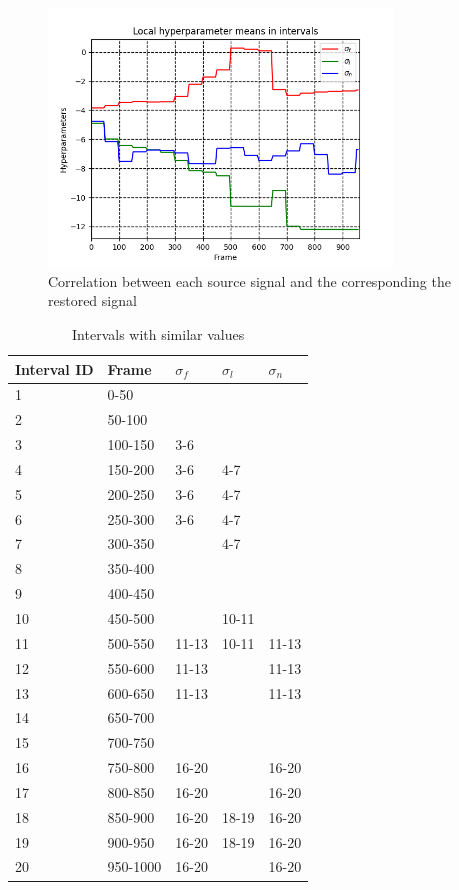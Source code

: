 \documentclass[conference]{IEEEtran}
\begin{document}
\begin{figure}[!t]
	\centering
	\includegraphics[width=3.6in]{interval.png}	
	\caption{Correlation between each source signal and the corresponding the restored signal}
	\label{fig:interval}
\end{figure}

\begin{table}
\caption{Intervals with similar values}
 	\label{table:interval}
\begin{tabular}{ |p{1.5cm}||p{1.2cm}|p{1cm}|p{1cm}|p{1cm}|  }
 \hline
 Interval ID & Frame & $\sigma_f$ & $\sigma_l$ & $\sigma_n$\\
 \hline
	1 & 0-50 	&		&		&		\\
	2 & 50-100 	&		&		&		\\
	3 & 100-150 & 3-6 	&		&		\\
	4 & 150-200 & 3-6 	& 4-7 	&		\\
	5 & 200-250 & 3-6 	& 4-7 	&		\\
	6 & 250-300 & 3-6 	& 4-7 	&		\\
	7 & 300-350 &		& 4-7 	&		\\
	8 & 350-400 &		&		&		\\
	9 & 400-450 &		&		&		\\
	10 & 450-500 &		& 10-11 &		\\
	11 & 500-550 & 11-13 & 10-11 & 11-13\\
	12 & 550-600 & 11-13 &		& 11-13\\
	13 & 600-650 & 11-13 &		& 11-13\\
	14 & 650-700 &		 &		&		\\
	15 & 700-750 &		 &		&		\\
	16 & 750-800 & 16-20 &		& 16-20 \\
	17 & 800-850 & 16-20 &		& 16-20 \\
	18 & 850-900 & 16-20 & 18-19 & 16-20 \\
	19 & 900-950 & 16-20 & 18-19 & 16-20 \\
	20 & 950-1000 & 16-20 &		& 16-20 \\
 \hline
\end{tabular}
\end{table}
\end{document}
